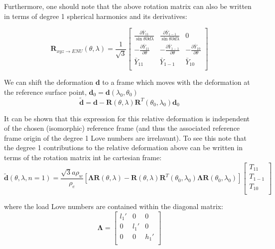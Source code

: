 \documentclass[a4paper,10pt,twoside,openany]{article}
\begin{document}
Furthermore, one should note that the above rotation matrix can also be written in terms of degree 1 spherical harmonics and its derivatives:

\begin{equation}
\textbf{R}_{xyz\rightarrow ENU}(\theta,\lambda)=\frac{1}{\sqrt{3}}\left[\begin{array}{ccc}\frac{\partial \bar{Y}_{11}}{\sin \theta \partial
      d\lambda}&\frac{\partial \bar{Y}_{1-1}}{\sin \theta \partial d\lambda}&0\\
      -\frac{\partial \bar{Y}_{11}}{\partial \theta}&-\frac{\partial \bar{Y}_{1-1}}{\partial \theta}&-\frac{\partial \bar{Y}_{10}}{\partial \theta}\\
      \bar{Y}_{11}&\bar{Y}_{1-1}&\bar{Y}_{10}\\
      \end{array}\right]
\end{equation}

We can shift the deformation $\textbf{d}$ to a frame which moves with the deformation at the reference surface point, $\textbf{d}_{0}=\textbf{d}(\lambda_{0},\theta_{0})$
\begin{equation}
\tilde{\textbf{d}}=\textbf{d}-\textbf{R}(\theta,\lambda)\textbf{R}^{T}(\theta_{0},\lambda_{0})\textbf{d}_{0}
\end{equation}

It can be shown that this expression for this relative deformation is independent of the chosen (isomorphic) reference frame (and thus the associated reference frame origin of the degree 1 Love numbers are irrelavant). To see this note that the degree 1 contributions to the relative  deformation above can be written in terms of the rotation matrix int he cartesian frame:
\begin{equation}
\tilde{\textbf{d}}(\theta,\lambda,n=1)=\frac{\sqrt{3}a\rho_{w}}{\rho_{e}}\left[\boldsymbol{\Lambda}\textbf{R}(\theta,\lambda)-\textbf{R}(\theta,\lambda)\textbf{R}^{T}(\theta_{0},\lambda_{0})\boldsymbol{\Lambda}\textbf{R}(\theta_{0},\lambda_{0})\right]\left[\begin{array}{c}T_{11}\\T_{1-1}\\T_{10}\\\end{array}\right]
\end{equation}

where the load Love numbers are contained within the diagonal matrix:
\begin{equation}
\boldsymbol{\Lambda}=\left[\begin{array}{ccc}l_{1}'&0&0\\0&l_{1}'&0\\0&0&h_{1}'\\\end{array}\right]
\end{equation}
\end{document}
